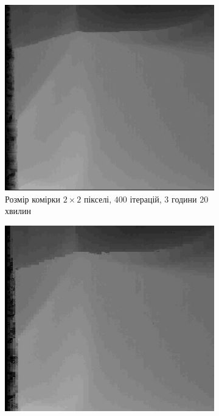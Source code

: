 \begin{figure}[h]
\centering
    \begin{subfigure}[t]{0.32\textwidth}
        \centering
        \includegraphics[width=\textwidth]{images/cloth_superpixel_2}
        \caption{Розмір комірки $2\times 2$ пікселі,
                 $400$ ітерацій,
                 $3$ години $20$ хвилин}
    \end{subfigure}
    \hfill
    \begin{subfigure}[t]{0.32\textwidth}
        \centering
        \includegraphics[width=\textwidth]{images/cloth_superpixel_based_stereo}

\end{subfigure}
\end{figure}

